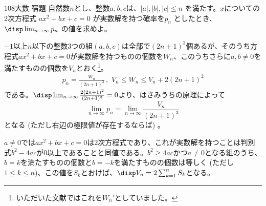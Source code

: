 \begin{prob}{108}{}{大数 宿題}
 自然数$n$とし、整数$a, b, c$は、$|a|, |b|, |c| \le n$ を満たす。$x$についての2次方程式 $ax^2+bx+c=0$ が実数解を持つ確率を$p_n$ としたとき、$\disp \lim_{n\to\infty} p_n$ の値を求めよ。
\end{prob}

$-1$以上$n$以下の整数3つの組$(a, b, c)$は全部で$(2n+1)^3$個あるが、そのうち方程式$ax^2+bx+c=0$が実数解を持つものの個数を$W_n$、このうちさらに$a, b\neq 0$を満たすものの個数を$V_n$とおく\footnote{いただいた文献ではこれを$W_n'$としていました。}。
\begin{align*}
 p_n=\frac{W_n}{(2n+1)^3} \,,\,\, V_n\le W_n \le V_n+2(2n+1)^2
\end{align*}
である。$\disp \lim_{n\to\infty} \frac{2(2n+1)^2}{(2n+1)^3}=0$より、はさみうちの原理によって
\[ \lim_{n\to\infty} p_n=\lim_{n\to\infty} \frac{V_n}{(2n+1)^3} \]
となる (ただし右辺の極限値が存在するならば) 。

$a\neq 0$では$ax^2+bx+c=0$は2次方程式であり、これが実数解を持つことは判別式$b^2-4ac$が0以上であることと同値である。$b^2\ge 4ac$かつ$a\neq 0$となる組のうち、$b=k$を満たすものの個数と$b=-k$を満たすものの個数は等しく (ただし$1\le k\le n$)、この値を$S_k$とおけば、$\disp V_n=2\sum_{k=1}^n S_k$となる。

